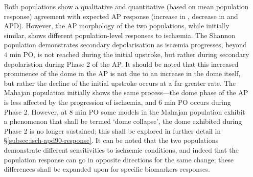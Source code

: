 \documentclass[../thesis-main.tex]{subfiles}
\begin{document}
Both populations show a qualitative and quantitative (based on mean population response) agreement with expected AP response (increase in \vrest{}, decrease in \dvdtmax{} and APD). However, the AP morphology of the two populations, while initially similar, shows different population-level responses to isch\ae{}mia. The Shannon population demonstrates secondary depolarisation as isc\ae{}mia progresses, \idest{} beyond 4 min PO, \vmax{} is not reached during the initial upstroke, but rather during secondary depolaristion during Phase 2 of the AP. It should be noted that this increased prominence of the dome in the AP is not due to an increase in the dome itself, but rather the decline of the initial upstroke occurs at a far greater rate. The Mahajan population initially shows the same process---the dome phase of the AP is less affected by the progression of isch\ae{}mia, and 6 min PO \vmax{} occurs during Phase 2. However, at 8 min PO some models in the Mahajan population exhibit a phenomenon that shall be termed `dome collapse', \idest{} the dome exhibited during Phase 2 is no longer sustained; this shall be explored in further detail in \S\ref{subsec:isch-apd90-response}. It can be noted that the two populations demonstrate different sensitivities to isch\ae{}mic conditions, and indeed that the population response can go in opposite directions for the same  change; these differences shall be expanded upon for specific biomarkers responses.
\end{document}
